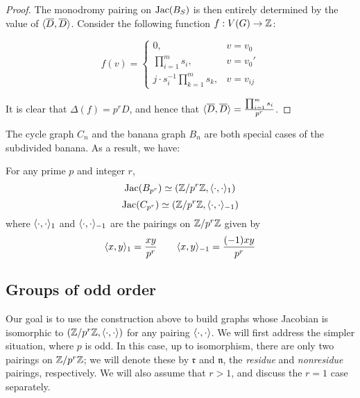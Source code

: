 \documentclass{amsart}
\begin{document}
\begin{proof}
  The monodromy pairing on $\operatorname{Jac}(B_S)$ is then entirely determined by
  the value of $\langle \overline{D}, \overline{D} \rangle$. Consider the
  following function $f:V(G) \to \mathbb{Z}$:

  \begin{equation*}
    f(v) = 
    \begin{cases}
      0, & v = v_0 \\
      \prod_{i=1}^ms_i, & v = v_0' \\
      j \cdot s_i^{-1}\prod_{k=1}^ms_k, & v = v_{ij}
    \end{cases}
  \end{equation*}

  It is clear that $\Delta(f) = p^rD$, and hence that
  $\langle \overline{D}, \overline{D} \rangle = \frac{\prod_{i=1}^ms_i}{p^r}$.
\end{proof}

The cycle graph $C_n$ and the banana graph $B_n$ are both special
cases of the subdivided banana. As a result, we have:

\begin{cor}
  For any prime $p$ and integer $r$, 
  \begin{equation*}
    \operatorname{Jac}(B_{p^r}) \simeq (\mathbb{Z}/p^r\mathbb{Z}, \langle \cdot, \cdot \rangle_1)
  \end{equation*}
  \begin{equation*}
    \operatorname{Jac}(C_{p^r}) \simeq (\mathbb{Z}/p^r\mathbb{Z}, \langle \cdot, \cdot \rangle_{-1})
  \end{equation*}
  where $\langle \cdot, \cdot \rangle_1$ and $\langle \cdot, \cdot \rangle_{-1}$ are the
  pairings on $\mathbb{Z}/p^r\mathbb{Z}$ given by
  \begin{equation*}
    \langle x, y \rangle_1 = \frac{xy}{p^r} \qquad \langle x, y \rangle_{-1} = \frac{(-1)xy}{p^r}
  \end{equation*}
\end{cor}

\subsection{Groups of odd order}
\label{sec:odd_groups}

Our goal is to use the construction above to build graphs whose
Jacobian is isomorphic to $(\mathbb{Z}/p^r\mathbb{Z}, \langle \cdot, \cdot \rangle)$ for any
pairing $\langle \cdot, \cdot \rangle$. We will first address the simpler
situation, where $p$ is odd. In this case, up to isomorphism, there
are only two pairings on $\mathbb{Z}/p^r\mathbb{Z}$; we will denote these by
$\mathfrak{r}$ and $\mathfrak{n}$, the \emph{residue} and
\emph{nonresidue} pairings, respectively. We will also assume that $r
> 1$, and discuss the $r=1$ case separately.
\end{document}
